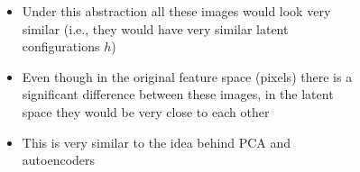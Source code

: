 \begin{frame}
\begin{columns}
\begin{overlayarea}{\textwidth}{\textheight}
		\begin{minipage}{1\linewidth}
		\begin{minipage}{0.45\linewidth}
		\begin{figure}
		\includegraphics[height=50pt,width=50pt]{images/cloudybeach3}
		\end{figure}
		\end{minipage}
		\begin{minipage}{0.45\linewidth}
		\begin{figure}
		\includegraphics[height=50pt,width=50pt]{images/cloudybeach4}
		\end{figure}
		\end{minipage}
		\end{minipage}
		\end{overlayarea}
		\begin{overlayarea}{\textwidth}{\textheight}
			\begin{itemize}\justifying
				\item<1-> Under this abstraction all these images would look very similar (i.e., they would have very similar latent configurations $h$)
				\item<2-> Even though in the original feature space (pixels) there is a significant difference between these images, in the latent space they would be very close to each other
				\item<3-> This is very similar to the idea behind PCA and autoencoders
			\end{itemize}
		\end{overlayarea}
	\end{columns}
\end{frame}


